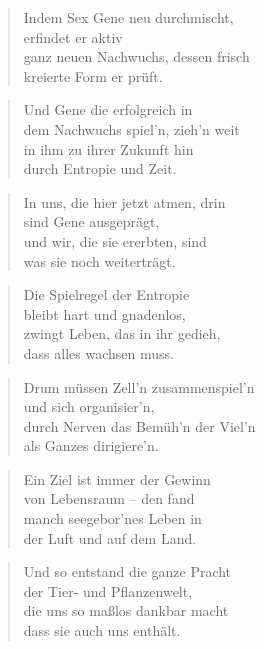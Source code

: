 \documentclass[10pt,a4paper]{article}
\begin{document}
\begin{paracol}{2}
\begin{verse}
Indem Sex Gene neu durchmischt, \\
erfindet er aktiv \\
ganz neuen Nachwuchs, dessen frisch \\
kreierte Form er prüft. \\
\end{verse}

\begin{verse}
Und Gene die erfolgreich in \\
dem Nachwuchs spiel’n, zieh’n weit \\
in ihm zu ihrer Zukunft hin \\
durch Entropie und Zeit. \\
\end{verse}

\begin{verse}
In uns, die hier jetzt atmen, drin \\
sind Gene ausgeprägt, \\
und wir, die sie ererbten, sind \\
was sie noch weiterträgt. \\
\end{verse}

\begin{verse}
Die Spielregel der Entropie \\
bleibt hart und gnadenlos, \\
zwingt Leben, das in ihr gedieh, \\
dass alles wachsen muss. \\
\end{verse}

\begin{verse}
Drum müssen Zell’n zusammenspiel’n \\
und sich organisier’n, \\
durch Nerven das Bemüh’n der Viel’n \\
als Ganzes dirigiere’n. \\
\end{verse}

\begin{verse}
Ein Ziel ist immer der Gewinn \\
von Lebensraum – den fand \\
manch seegebor’nes Leben in \\
der Luft und auf dem Land. \\
\end{verse}

\begin{verse}
Und so entstand die ganze Pracht \\
der Tier- und Pflanzenwelt, \\
die uns so maßlos dankbar macht \\
dass sie auch uns enthält. \\
\end{verse}


\end{paracol}
\end{document}
